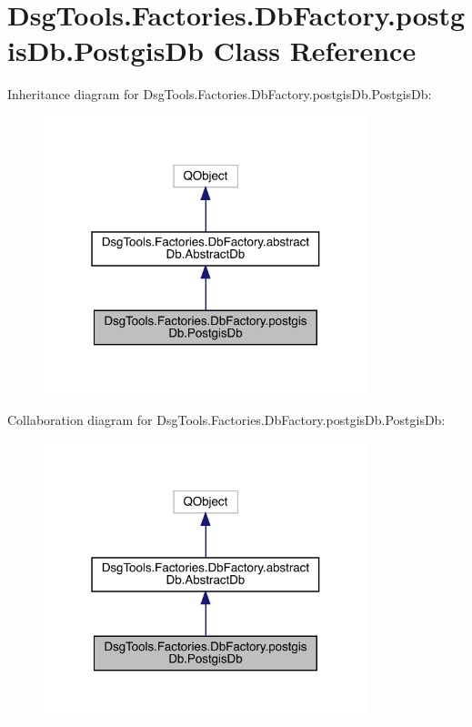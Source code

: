 \hypertarget{class_dsg_tools_1_1_factories_1_1_db_factory_1_1postgis_db_1_1_postgis_db}{}\section{Dsg\+Tools.\+Factories.\+Db\+Factory.\+postgis\+Db.\+Postgis\+Db Class Reference}
\label{class_dsg_tools_1_1_factories_1_1_db_factory_1_1postgis_db_1_1_postgis_db}


Inheritance diagram for Dsg\+Tools.\+Factories.\+Db\+Factory.\+postgis\+Db.\+Postgis\+Db\+:
\nopagebreak
\begin{figure}[H]
\begin{center}
\leavevmode
\includegraphics[width=268pt]{class_dsg_tools_1_1_factories_1_1_db_factory_1_1postgis_db_1_1_postgis_db__inherit__graph}
\end{center}
\end{figure}


Collaboration diagram for Dsg\+Tools.\+Factories.\+Db\+Factory.\+postgis\+Db.\+Postgis\+Db\+:
\nopagebreak
\begin{figure}[H]
\begin{center}
\leavevmode
\includegraphics[width=268pt]{class_dsg_tools_1_1_factories_1_1_db_factory_1_1postgis_db_1_1_postgis_db__coll__graph}
\end{center}
\end{figure}
